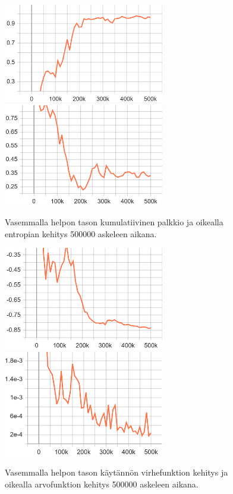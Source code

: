 \documentclass[utf8]{gradu3}
\begin{document}
\begin{figure}[h]
\includegraphics[width=7cm]{B_Cumulative_Reward.png}
\includegraphics[width=7cm]{B_Policy_Entropy.png}
\caption{Vasemmalla helpon tason kumulatiivinen palkkio ja oikealla entropian kehitys 500000 askeleen aikana.}
\label{beginnercumulativeentropy}
\end{figure}

\begin{figure}[h]
\includegraphics[width=7cm]{B_Policy_Loss.png}
\includegraphics[width=7cm]{B_Value_Loss.png}
\caption{Vasemmalla helpon tason käytännön virhefunktion kehitys ja oikealla arvofunktion kehitys 500000 askeleen aikana.}
\label{beginnerloss}
\end{figure}
\end{document}
